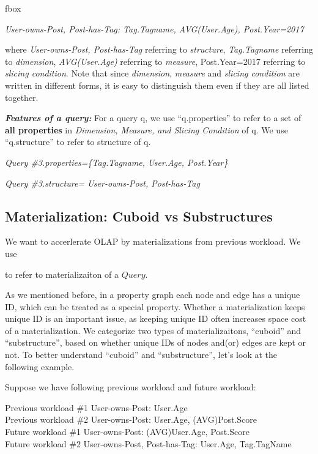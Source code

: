 fbox{
\textit{User-owns-Post, Post-has-Tag: Tag.Tagname, AVG(User.Age), Post.Year=2017
}

where \textit{User-owns-Post, Post-has-Tag} referring to  \textit{structure}, \textit{Tag.Tagname} referring to \textit{dimension},\textit{ AVG(User.Age) } referring to \textit{measure}, {Post.Year=2017} referring to \textit{slicing condition}. Note that since \textit{dimension}, \textit{measure} and \textit{slicing condition} are written in different forms, it is easy to distinguish them even if they are all listed together.


 \textbf{\textit{Features of a query:}} For a query q, we use ``q.properties'' to refer to a set of \textbf{all properties} in \textit{Dimension, Measure, and Slicing Condition} of q. We use ``q.structure'' to refer to structure of q.

 \textit{Query \#3.properties=\{Tag.Tagname, User.Age, Post.Year\}}
 
 \textit{Query \#3.structure= User-owns-Post, Post-has-Tag}



\subsection{Materialization: Cuboid vs Substructures}
\label{Materialization: Cuboid vs Substructures}

We want to accerlerate OLAP by materializations from previous workload. We use


to refer to materializaiton of a $Query$.

As we mentioned before, in a property graph each node and edge has a unique ID, which can be treated as a special property. Whether a materialization keeps unique ID is an important issue, as keeping unique ID often increases space cost of a materialization. We categorize two types of materializaitons, ``cuboid'' and ``substructure'', based on whether unique IDs of nodes and(or) edges are kept or not. To better understand ``cuboid'' and ``substructure'', let's look at the following example.


Suppose we have following previous workload and future workload:

Previous workload \#1 User-owns-Post: User.Age\\
Previous workload \#2 User-owns-Post: User.Age, (AVG)Post.Score\\
Future workload \#1 User-owns-Post: (AVG)User.Age, Post.Score	\\
Future workload \#2 User-owns-Post, Post-has-Tag: User.Age, Tag.TagName




}
